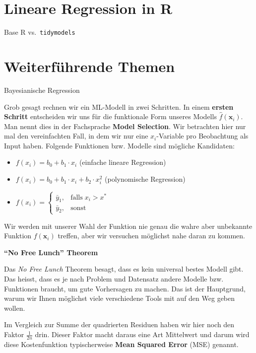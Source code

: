 \documentclass[
]{book}
\providecommand{\tightlist}{%
  \setlength{\itemsep}{0pt}\setlength{\parskip}{0pt}}
\begin{document}
\hypertarget{lineare-regression-in-r}{%
\section{Lineare Regression in R}\label{lineare-regression-in-r}}

Base R vs.~\texttt{tidymodels}

\hypertarget{weiterfuxfchrende-themen}{%
\section{Weiterführende Themen}\label{weiterfuxfchrende-themen}}

Bayesianische Regression

Grob gesagt rechnen wir ein ML-Modell in zwei Schritten. In einem \textbf{ersten Schritt} entscheiden wir uns für die funktionale Form unseres Modells \(\hat{f}(\mathbf{x}_i)\). Man nennt dies in der Fachsprache \textbf{Model Selection}. Wir betrachten hier nur mal den vereinfachten Fall, in dem wir nur eine \(x_i\)-Variable pro Beobachtung als Input haben. Folgende Funktionen bzw. Modelle sind mögliche Kandidaten:

\begin{itemize}
\tightlist
\item
  \(f(x_i) = b_0 + b_1 \cdot x_i\) (einfache lineare Regression)
\item
  \(f(x_i) = b_0 + b_1 \cdot x_i + b_2 \cdot x_i^2\) (polynomische Regression)
\item
  \(f(x_i) = \begin{cases} \bar{y}_1, & \text{falls}\; x_i > x^*\\ \bar{y}_2, & \text{sonst} \end{cases}\)
\end{itemize}

Wir werden mit unserer Wahl der Funktion nie genau die wahre aber unbekannte Funktion \(f(\mathbf{x}_i)\) treffen, aber wir versuchen möglichst nahe daran zu kommen.

\textbf{``No Free Lunch'' Theorem}

Das \emph{No Free Lunch} Theorem besagt, dass es kein universal bestes Modell gibt. Das heisst, dass es je nach Problem und Datensatz andere Modelle bzw. Funktionen braucht, um gute Vorhersagen zu machen. Das ist der Hauptgrund, warum wir Ihnen möglichst viele verschiedene Tools mit auf den Weg geben wollen.

Im Vergleich zur Summe der quadrierten Residuen haben wir hier noch den Faktor \(\frac{1}{2n}\) drin. Dieser Faktor macht daraus eine Art Mittelwert und darum wird diese Kostenfunktion typischerweise \textbf{Mean Squared Error} (MSE) genannt.
\end{document}
